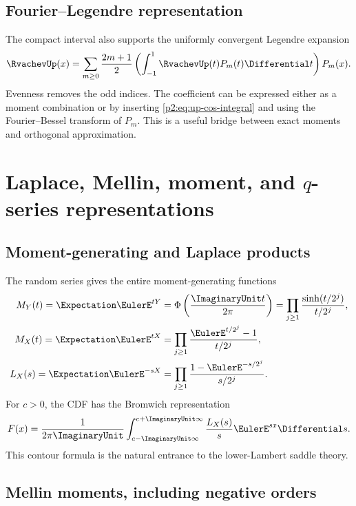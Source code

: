 \documentclass[11pt]{article}
\theoremstyle{definition}
\theoremstyle{remark}
\begin{document}
\subsection{Fourier--Legendre representation}

The compact interval also supports the uniformly convergent Legendre expansion
\begin{equation}
 \RvachevUp(x)=\sum_{m\ge0}\frac{2m+1}{2}
 \left(\int_{-1}^1\RvachevUp(t)P_m(t)\Differential t\right)P_m(x).        \label{p2:eq:Legendre}
\end{equation}
Evenness removes the odd indices.  The coefficient can be expressed either as a moment
combination or by inserting \eqref{p2:eq:up-cos-integral} and using the Fourier--Bessel transform
of $P_m$.  This is a useful bridge between exact moments and orthogonal approximation.

\section{Laplace, Mellin, moment, and \texorpdfstring{$q$}{q}-series representations}
\label{p2:sec:laplace-moments}

\subsection{Moment-generating and Laplace products}

The random series gives the entire moment-generating functions
\begin{align}
 M_Y(t)=\Expectation\EulerE^{tY}
 &=\Phi\left(\frac{\ImaginaryUnit t}{2\pi}\right)
 =\prod_{j\ge1}\frac{\sinh(t/2^j)}{t/2^j},               \label{p2:eq:MY}\\
 M_X(t)=\Expectation\EulerE^{tX}
 &=\prod_{j\ge1}\frac{\EulerE^{t/2^j}-1}{t/2^j},             \label{p2:eq:MX}\\
 L_X(s)=\Expectation\EulerE^{-sX}
 &=\prod_{j\ge1}\frac{1-\EulerE^{-s/2^j}}{s/2^j}.           \label{p2:eq:LX}
\end{align}
For $c>0$, the CDF has the Bromwich representation
\begin{equation}
 F(x)=\frac{1}{2\pi\ImaginaryUnit}\int_{c-\ImaginaryUnit\infty}^{c+\ImaginaryUnit\infty}
 \frac{L_X(s)}{s}\EulerE^{sx}\Differential s.                          \label{p2:eq:F-Bromwich}
\end{equation}
This contour formula is the natural entrance to the lower-Lambert saddle theory.

\subsection{Mellin moments, including negative orders}
\end{document}

